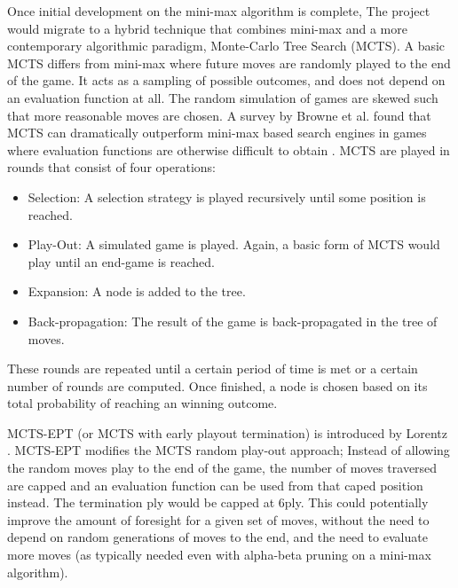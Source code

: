 \documentclass[12pt,a4paper]{article}
\begin{document}
        Once initial development on the mini-max algorithm is complete, The project would migrate to a hybrid technique that combines mini-max and a more contemporary algorithmic paradigm, Monte-Carlo Tree Search (MCTS). A basic MCTS differs from mini-max where future moves are randomly played to the end of the game. It acts as a sampling of possible outcomes, and does not depend on an evaluation function at all. The random simulation of games are skewed such that more reasonable moves are chosen. A survey by Browne et al. found that MCTS can dramatically outperform mini-max based search engines in games where evaluation functions are otherwise difficult to obtain \cite{browne_survey_2012}. MCTS are played in rounds that consist of four operations:

        \begin{itemize}
            \item Selection: A selection strategy is played recursively until some position is reached. 
            \item Play-Out: A simulated game is played. Again, a basic form of MCTS would play until an end-game is reached.
            \item Expansion: A node is added to the tree.
            \item Back-propagation: The result of the game is back-propagated in the tree of moves.
        \end{itemize}

        These rounds are repeated until a certain period of time is met or a certain number of rounds are computed. Once finished, a node is chosen based on its total probability of reaching an winning outcome.

        MCTS-EPT (or MCTS with early playout termination) is introduced by Lorentz \cite{lorentz_using_2016}. MCTS-EPT modifies the MCTS random play-out approach; Instead of allowing the random moves play to the end of the game, the number of moves traversed are capped and an evaluation function can be used from that caped position instead. The termination ply would be capped at 6ply. This could potentially improve the amount of foresight for a given set of moves, without the need to depend on random generations of moves to the end, and the need to evaluate more moves (as typically needed even with alpha-beta pruning on a mini-max algorithm).
\end{document}
